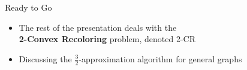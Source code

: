 \begin{frame}{Ready to Go}
\begin{itemize}
	
\item
The rest of the presentation deals with the \\
\textbf{2-Convex Recoloring} problem, denoted \alert{2-CR} 

\pause\item
Discussing the $\frac{3}{2}$-approximation algorithm for general graphs 

	
\end{itemize}
\end{frame}